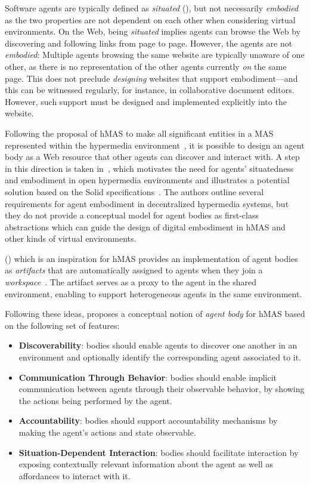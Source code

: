 Software agents are typically defined as \emph{situated} (), but not necessarily \emph{embodied} as the two properties are not dependent on each other when considering virtual environments.
%
On the Web, being \emph{situated} implies agents can browse the Web by discovering and following links from page to page. However, the agents are not \emph{embodied}: Multiple agents browsing the same website are typically unaware of one other, as there is no representation of the other agents currently \emph{on} the same page.
%
This does not preclude \textit{designing} websites that support embodiment---and this can be witnessed regularly, for instance, in collaborative document editors. However, such support must be designed and implemented explicitly into the website.

Following the proposal of \ac{hMAS} to make all significant entities in a \ac{MAS} represented within the hypermedia environment~\cite{Ciortea_Boissier_Ricci_2019}, it is possible to design an agent body as a Web resource that other agents can discover and interact with. 
%
A step in this direction is taken in~\cite{Zimmermann2023}, which motivates the need for agents' situatedness and embodiment in open hypermedia environments and illustrates a potential solution based on the Solid specifications~\cite{Solid_0.9.0:21}. The authors outline several requirements for agent embodiment in decentralized hypermedia systems, but they do not provide a conceptual model for agent bodies as first-class abstractions which can guide the design of digital embodiment in \ac{hMAS} and other kinds of virtual environments.

\cartago{} () which is an inspiration for \ac{hMAS} provides an implementation of agent bodies as \emph{artifacts} that are automatically assigned to agents when they join a \emph{workspace}~\cite{Ricci_Piunti_Viroli_Omicini_2009}.
%
The artifact serves as a proxy to the agent in the shared environment, enabling \cartago{} to support heterogeneous agents in the same environment.

Following these ideas, \cite{embodiment2025} proposes a conceptual notion of \emph{agent body} for \ac{hMAS} based on the following set of features:
\begin{itemize}
    \item \textbf{Discoverability}: bodies should enable agents to discover one another in an environment and optionally identify the corresponding agent associated to it. 
    \item \textbf{Communication Through Behavior}: bodies should enable implicit communication between agents through their observable behavior, by showing the actions being performed by the agent.
    \item \textbf{Accountability}: bodies should support accountability mechanisms by making the agent's actions and state observable.
    \item \textbf{Situation-Dependent Interaction}: bodies should facilitate interaction by exposing contextually relevant information about the agent as well as affordances to interact with it.
\end{itemize}

